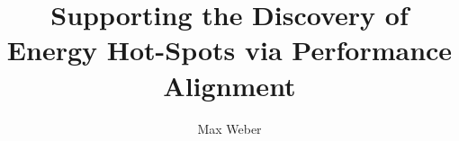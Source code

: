 \title{Supporting the Discovery of Energy Hot-Spots via Performance Alignment}
\author{Max Weber}
\date{ }
\maketitle
